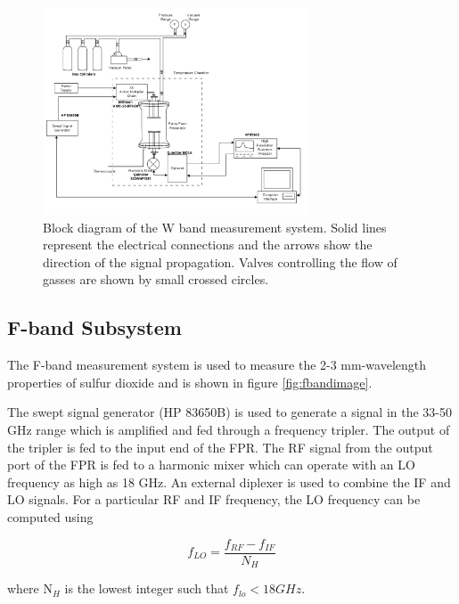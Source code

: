 \begin{figure}[H]
    \centering
	\includegraphics[width=0.7\textwidth]{./images/w-bandsystem.png}
	\caption{Block diagram of the W band measurement system. Solid lines represent the electrical connections and the arrows show the direction of the signal propagation. Valves controlling the flow of gasses are shown by small crossed circles.}
    \label{fig:wbandimage}
\end{figure}


\subsection{F-band Subsystem}
The F-band measurement system is used to measure the 2-3 mm-wavelength properties of sulfur dioxide and is shown in figure \ref{fig:fbandimage}.

The swept signal generator (HP 83650B) is used to generate a signal in the 33-50 GHz range which
is amplified and fed through a frequency tripler. The output of the tripler is fed to the input end of the FPR. The RF signal from the output port of the FPR is fed to a harmonic mixer which can operate with an LO frequency as high as 18 GHz. An external diplexer is used to combine the IF and LO signals. For a particular RF and IF frequency,  the LO frequency can be computed using

\begin{equation} \label{eq:fbandlo}
f_{LO} = \frac{f_{RF} - f_{IF}}{N_H	}
\end{equation}

\noindent where N$_H$ is the lowest integer such that $f_{lo} < 18 GHz$.

